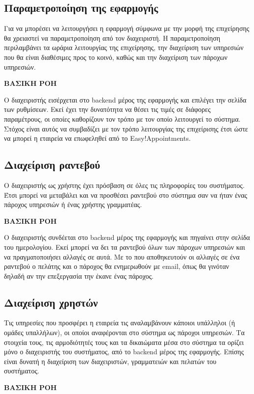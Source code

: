 \subsection{Παραμετροποίηση της εφαρμογής}
Για να μπορέσει να λειτουργήσει η εφαρμογή σύμφωνα με την μορφή της επιχείρησης θα χρειαστεί να παραμετροποίηση από τον διαχειριστή. Η παραμετροποίηση περιλαμβάνει τα ωράρια λειτουργίας της επιχείρησης, την διαχείριση των υπηρεσιών που θα είναι διαθέσιμες προς το κοινό, καθώς και την διαχείριση των πάροχων υπηρεσιών.

\textbf{ΒΑΣΙΚΗ ΡΟΗ}

Ο διαχειριστής εισέρχεται στο backend μέρος της εφαρμογής και επιλέγει την σελίδα των ρυθμίσεων. Εκεί έχει την δυνατότητα να θέσει τις τιμές σε διάφορες παραμέτρους, οι οποίες καθορίζουν τον τρόπο με τον οποίο λειτουργεί το σύστημα. Στόχος είναι αυτός να συμβαδίζει με τον τρόπο λειτουργίας της επιχείρισης έτσι ώστε να μπορεί η εταιρεία να επωφεληθεί από το Easy!Appointments.

\subsection{Διαχείριση ραντεβού}
Ο διαχειριστής ως χρήστης έχει πρόσβαση σε όλες τις πληροφορίες του συστήματος. Έτσι μπορεί να μεταβάλει και να προσθέσει ραντεβού στο σύστημα σαν να ήταν ένας πάροχος υπηρεσιών ή ένας χρήστης γραμματέας.

\textbf {ΒΑΣΙΚΗ ΡΟΗ}

Ο διαχειριστής συνδέεται στο backend μέρος της εφαρμογής και πηγαίνει στην σελίδα του ημερολογίου. Εκεί μπορεί να δει τα ραντεβού όλων των πάροχων υπηρεσιών και να πραγματοποιήσει αλλαγές σε αυτά. Με το που αποθηκευτούν οι αλλαγές σε ένα ραντεβού ο πελάτης και ο πάροχος θα ενημερωθούν με email, όπως θα γινόταν δηλαδή αν την επεξεργασία την έκανε ένας πάροχος.

\subsection {Διαχείριση χρηστών}
Τις υπηρεσίες που προσφέρει η εταιρεία τις αναλαμβάνουν κάποιοι υπάλληλοι (ή ομάδες υπαλλήλων), οι οποίοι αναφέρονται στο σύστημα ως πάροχοι υπηρεσιών. Τα στοιχεία τους, τις αρμοδιότητές τους και τα δικαιώματα μέσα στο σύστημα τα ορίζει μόνο ο διαχειριστής του συστήματος, από το backend μέρος της εφαρμογής. Επίσης είναι δυνατή η διαχείριση των διαχειριστών, γραμματειών και πελατών του συστήματος.

\textbf{ΒΑΣΙΚΗ ΡΟΗ}

